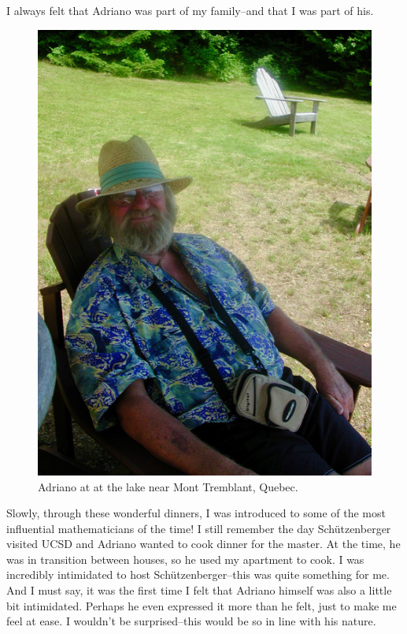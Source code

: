 \documentclass{notices}
\begin{document}
I always felt that Adriano was part of my family--and that I was part of his. 
  \begin{figure}
    \centering
    \includegraphics[width=.95\linewidth]{Nantel_Bergeron/DSCN3064.jpeg}
{\footnotesize Adriano at at the lake near Mont Tremblant, Quebec.  }
\end{figure}

Slowly, through these wonderful dinners, I was introduced to some of the most influential mathematicians of the time! I still remember the day Schützenberger visited UCSD and Adriano wanted to cook dinner for the master. At the time, he was in transition between houses, so he used my apartment to cook. I was incredibly intimidated to host Schützenberger--this was quite something for me. And I must say, it was the first time I felt that Adriano himself was also a little bit intimidated. Perhaps he even expressed it more than he felt, just to make me feel at ease. I wouldn't be surprised--this would be so in line with his nature.
\end{document}
